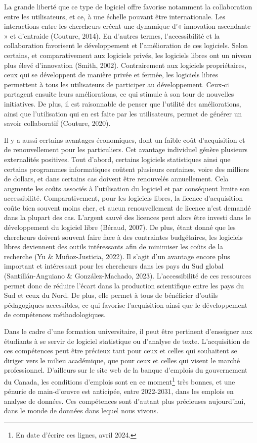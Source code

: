 \documentclass[
  letterpaper,
  DIV=11,
  numbers=noendperiod]{scrreprt}
\begin{document}
La grande liberté que ce type de logiciel offre favorise notamment la
collaboration entre les utilisateurs, et ce, à une échelle pouvant être
internationale. Les interactions entre les chercheurs créent une
dynamique d'« innovation ascendante » et d'entraide (Couture, 2014). En
d'autres termes, l'accessibilité et la collaboration favorisent le
développement et l'amélioration de ces logiciels. Selon certains, et
comparativement aux logiciels privés, les logiciels libres ont un niveau
plus élevé d'innovation (Smith, 2002). Contrairement aux logiciels
propriétaires, ceux qui se développent de manière privée et fermée, les
logiciels libres permettent à tous les utilisateurs de participer au
développement. Ceux-ci partagent ensuite leurs améliorations, ce qui
stimule à son tour de nouvelles initiatives. De plus, il est raisonnable
de penser que l'utilité des améliorations, ainsi que l'utilisation qui
en est faite par les utilisateurs, permet de générer un savoir
collaboratif (Couture, 2020).

Il y a aussi certains avantages économiques, dont un faible coût
d'acquisition et de renouvellement pour les particuliers. Cet avantage
individuel génère plusieurs externalités positives. Tout d'abord,
certains logiciels statistiques ainsi que certains programmes
informatiques coûtent plusieurs centaines, voire des milliers de
dollars, et dans certains cas doivent être renouvelés annuellement. Cela
augmente les coûts associés à l'utilisation du logiciel et par
conséquent limite son accessibilité. Comparativement, pour les logiciels
libres, la licence d'acquisition coûte bien souvent moins cher, et aucun
renouvellement de licence n'est demandé dans la plupart des cas.
L'argent sauvé des licences peut alors être investi dans le
développement du logiciel libre (Béraud, 2007). De plus, étant donné que
les chercheurs doivent souvent faire face à des contraintes budgétaires,
les logiciels libres deviennent des outils intéressants afin de
minimiser les coûts de la recherche (Yu \& Muñoz-Justicia, 2022). Il
s'agit d'un avantage encore plus important et intéressant pour les
chercheurs dans les pays du Sud global (Santillán-Anguiano \&
González-Machado, 2023). L'accessibilité de ces ressources permet donc
de réduire l'écart dans la production scientifique entre les pays du Sud
et ceux du Nord. De plus, elle permet à tous de bénéficier d'outils
pédagogiques accessibles, ce qui favorise l'acquisition ainsi que le
développement de compétences méthodologiques.

Dans le cadre d'une formation universitaire, il peut être pertinent
d'enseigner aux étudiants à se servir de logiciel statistique ou
d'analyse de texte. L'acquisition de ces compétences peut être précieux
tant pour ceux et celles qui souhaitent se diriger vers le milieu
académique, que pour ceux et celles qui visent le marché professionnel.
D'ailleurs sur le site web de la banque d'emplois du gouvernement du
Canada, les conditions d'emplois sont en ce moment\footnote{En date
  d'écrire ces lignes, avril 2024.} très bonnes, et une pénurie de
main-d'œuvre est anticipée, entre 2022-2031, dans les emplois en analyse
de données. Ces compétences sont d'autant plus précieuses aujourd'hui,
dans le monde de données dans lequel nous vivons.
\end{document}
